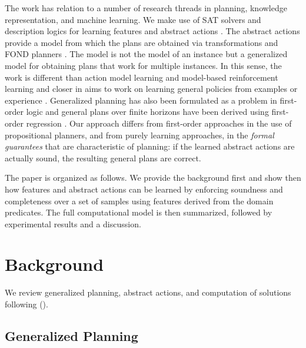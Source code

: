\documentclass[letterpaper]{article} %
\newcommand{\citeay}[1]{\citeauthor{#1} (\citeyear{#1})}
\begin{document}
The work has relation to a number of research threads in planning, knowledge
representation, and machine learning. We make use of SAT solvers and description
logics for learning features and abstract actions \cite{sat-handbook,dl-handbook}.
The abstract actions provide a model from which the plans are obtained via
transformations and FOND planners \cite{geffner:book,ghallab:book}.
The model is not the model of an instance but a generalized model for obtaining
plans that work for multiple instances. In this sense, the work is different than
action model learning \cite{yang:action-learning} and model-based reinforcement
learning and closer in aims to work on learning general policies from examples or
experience \cite{martin:concept,fern:bias,mazebase,general-drl}.
Generalized planning has also been formulated as a problem in first-order logic
\cite{srivastava:generalized} and general plans over finite horizons have been
derived using first-order regression \cite{boutilier2001symbolic,wang2008first,van2012solving}.
Our approach differs from first-order approaches in the use of propositional
planners, and from purely learning approaches, in the \emph{formal guarantees} that
are characteristic of planning: if the learned abstract actions are actually sound,
the resulting general plans are correct. 

The paper is organized as follows. We provide the background  first and show then
how features and abstract actions can be learned by enforcing soundness and
completeness over a set of samples  using features derived from the domain predicates.
The full computational model is then summarized, followed by experimental results
and a discussion.


\section{Background}

We review generalized planning, abstract actions, and computation of solutions 
following  \citeay{bonet:ijcai2018}.


\subsection{Generalized Planning}
\end{document}
